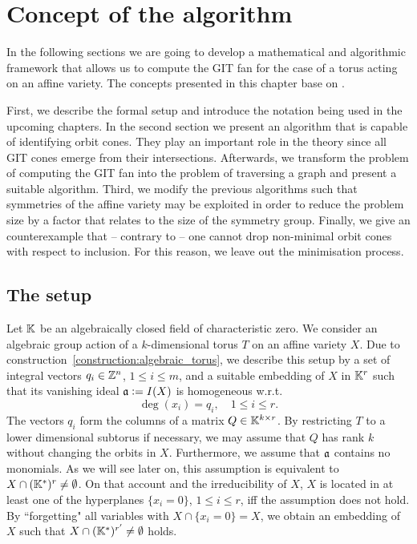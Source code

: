 



\label{algorithm:main}

\chapter{Concept of the algorithm}
\label{chap:algorithm}

In the following sections we are going to develop a mathematical and algorithmic framework that allows us to compute the GIT fan for the case of a torus acting on an affine variety. The concepts presented in this chapter base on \cite{gitfan_symmetry, gitfan}.

First, we describe the formal setup and introduce the notation being used in the upcoming chapters. In the second section we present an algorithm that is capable of identifying orbit cones. They play an important role in the theory since all GIT cones emerge from their intersections. Afterwards, we transform the problem of computing the GIT fan into the problem of traversing a graph and present a suitable algorithm. Third, we modify the previous algorithms such that symmetries of the affine variety may be exploited in order to reduce the problem size by a factor that relates to the size of the symmetry group. Finally, we give an counterexample that -- contrary to \cite{gitfan_symmetry} -- one cannot drop non-minimal orbit cones with respect to inclusion. For this reason, we leave out the minimisation process.

\section{The setup}
\label{section:setup}

Let $\mathbb{K}$ be an algebraically closed field of characteristic zero. We consider an algebraic group action of a $k$-dimensional torus $T$ on an affine variety $X$. Due to construction~\ref{construction:algebraic_torus}, we describe this setup by a set of integral vectors $q_i\in\mathbb{Z}^n$, $1\leq i \leq m$, and a suitable embedding of $X$ in $\mathbb{K}^r$ such that its vanishing ideal $\mathfrak{a} \mathrel{\mathop:}= I(X)$ is homogeneous w.r.t.
$$\deg(x_i) = q_i,\quad 1\leq i \leq r.$$
The vectors $q_i$ form the columns of a matrix $Q\in\mathbb{K}^{k\times r}$. By restricting $T$ to a lower dimensional subtorus if necessary, we may assume that $Q$ has rank $k$ without changing the orbits in $X$. Furthermore, we assume that $\mathfrak{a}$ contains no monomials. As we will see later on, this assumption is equivalent to $X\cap (\mathbb{K}^*)^r \neq \emptyset$. On that account and the irreducibility of $X$, $X$ is located in at least one of the hyperplanes $\{x_i = 0\}$, $1\leq i \leq r$, iff the assumption does not hold. By ``forgetting" all variables with $X\cap \{x_i = 0\} = X$, we obtain an embedding of $X$ such that $X\cap (\mathbb{K}^*)^{r'} \neq \emptyset$ holds.

